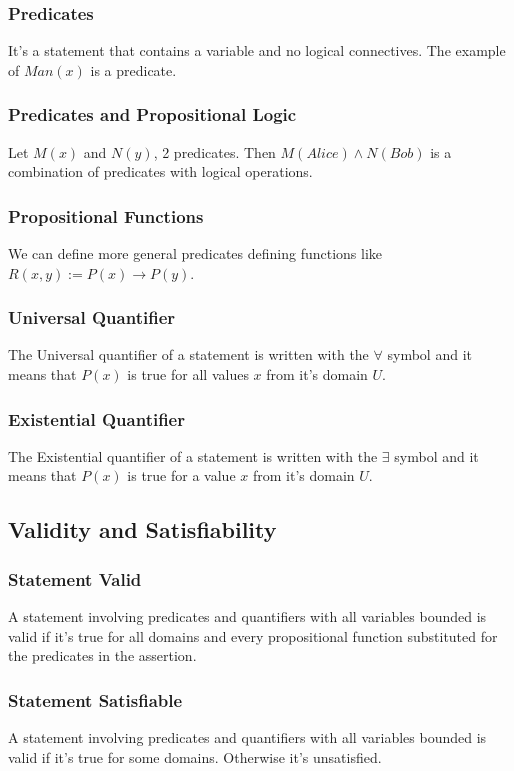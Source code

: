 \documentclass{article}
\begin{document}
\subsubsection{Predicates} It's a statement that contains a variable and no logical connectives. The example of $ Man(x) $ is a predicate.

\subsubsection{Predicates and Propositional Logic} Let $ M(x) $ and $ N(y) $, 2 predicates. Then $ M(Alice) \wedge N(Bob) $ is a combination of predicates with logical operations.

\subsubsection{Propositional Functions} We can define more general predicates defining functions like $ R(x,y) := P(x) \rightarrow P(y) $.

\subsubsection{Universal Quantifier} The Universal quantifier of a statement is written with the $ \forall $ symbol and it means that $ P(x) $ is true for all values $ x $ from it's domain $ U $.

\subsubsection{Existential Quantifier} The Existential quantifier of a statement is written with the $ \exists $ symbol and it means that $ P(x) $ is true for a value $ x $ from it's domain $ U $.

\subsection{Validity and Satisfiability}
\subsubsection{Statement Valid} A statement involving predicates and quantifiers with all variables bounded is valid if it's true for all domains and every propositional function substituted for the predicates in the assertion.

\subsubsection{Statement Satisfiable} A statement involving predicates and quantifiers with all variables bounded is valid if it's true for some domains. Otherwise it's unsatisfied.
\end{document}
